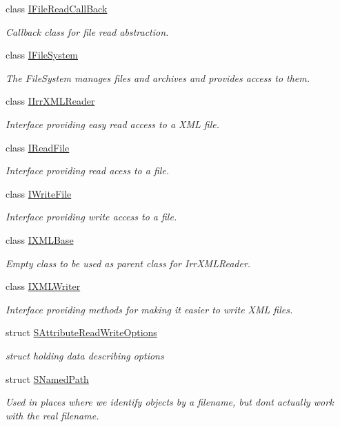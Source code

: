 \begin{DoxyCompactItemize}
class \hyperlink{classirr_1_1io_1_1IFileReadCallBack}{I\+File\+Read\+Call\+Back}
\begin{DoxyCompactList}\small\item\em Callback class for file read abstraction. \end{DoxyCompactList}\item 
class \hyperlink{classirr_1_1io_1_1IFileSystem}{I\+File\+System}
\begin{DoxyCompactList}\small\item\em The File\+System manages files and archives and provides access to them. \end{DoxyCompactList}\item 
class \hyperlink{classirr_1_1io_1_1IIrrXMLReader}{I\+Irr\+X\+M\+L\+Reader}
\begin{DoxyCompactList}\small\item\em Interface providing easy read access to a X\+ML file. \end{DoxyCompactList}\item 
class \hyperlink{classirr_1_1io_1_1IReadFile}{I\+Read\+File}
\begin{DoxyCompactList}\small\item\em Interface providing read acess to a file. \end{DoxyCompactList}\item 
class \hyperlink{classirr_1_1io_1_1IWriteFile}{I\+Write\+File}
\begin{DoxyCompactList}\small\item\em Interface providing write access to a file. \end{DoxyCompactList}\item 
class \hyperlink{classirr_1_1io_1_1IXMLBase}{I\+X\+M\+L\+Base}
\begin{DoxyCompactList}\small\item\em Empty class to be used as parent class for Irr\+X\+M\+L\+Reader. \end{DoxyCompactList}\item 
class \hyperlink{classirr_1_1io_1_1IXMLWriter}{I\+X\+M\+L\+Writer}
\begin{DoxyCompactList}\small\item\em Interface providing methods for making it easier to write X\+ML files. \end{DoxyCompactList}\item 
struct \hyperlink{structirr_1_1io_1_1SAttributeReadWriteOptions}{S\+Attribute\+Read\+Write\+Options}
\begin{DoxyCompactList}\small\item\em struct holding data describing options \end{DoxyCompactList}\item 
struct \hyperlink{structirr_1_1io_1_1SNamedPath}{S\+Named\+Path}
\begin{DoxyCompactList}\small\item\em Used in places where we identify objects by a filename, but don\textquotesingle{}t actually work with the real filename. \end{DoxyCompactList}\end{DoxyCompactItemize}
